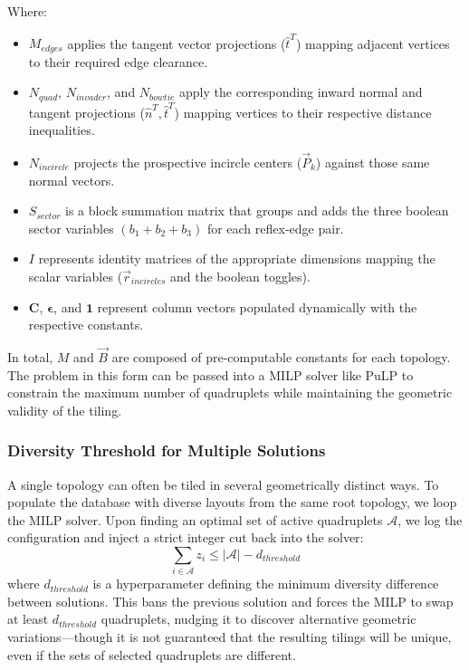\documentclass[11pt]{article}
\begin{document}
Where:
\begin{itemize}
    \item $M_{edges}$ applies the tangent vector projections ($\hat{t}^T$) mapping adjacent vertices to their required edge clearance.
    \item $N_{quad}$, $N_{invader}$, and $N_{bowtie}$ apply the corresponding inward normal and tangent projections ($\hat{n}^T, \hat{t}^T$) mapping vertices to their respective distance inequalities.
    \item $N_{incircle}$ projects the prospective incircle centers ($\vec{P}_k$) against those same normal vectors.
    \item $S_{sector}$ is a block summation matrix that groups and adds the three boolean sector variables $(b_1 + b_2 + b_3)$ for each reflex-edge pair.
    \item $I$ represents identity matrices of the appropriate dimensions mapping the scalar variables ($\vec{r}_{incircles}$ and the boolean toggles).
    \item $\mathbf{C}$, $\boldsymbol{\epsilon}$, and $\mathbf{1}$ represent column vectors populated dynamically with the respective constants.
\end{itemize}
In total, $M$ and $\vec{B}$ are composed of pre-computable constants for each topology. The problem in this form can be passed into a MILP solver like PuLP to constrain the maximum number of quadruplets while maintaining the geometric validity of the tiling.

\subsubsection{Diversity Threshold for Multiple Solutions}
A single topology can often be tiled in several geometrically distinct ways. To populate the database with diverse layouts from the same root topology, we loop the MILP solver. Upon finding an optimal set of active quadruplets $\mathcal{A}$, we log the configuration and inject a strict integer cut back into the solver:
\begin{equation}
    \sum_{i \in \mathcal{A}} z_i \le |\mathcal{A}| - d_{threshold}
\end{equation}
where $d_{threshold}$ is a hyperparameter defining the minimum diversity difference between solutions. This bans the previous solution and forces the MILP to swap at least $d_{threshold}$ quadruplets, nudging it to discover alternative geometric variations---though it is not guaranteed that the resulting tilings will be unique, even if the sets of selected quadruplets are different.
\end{document}

